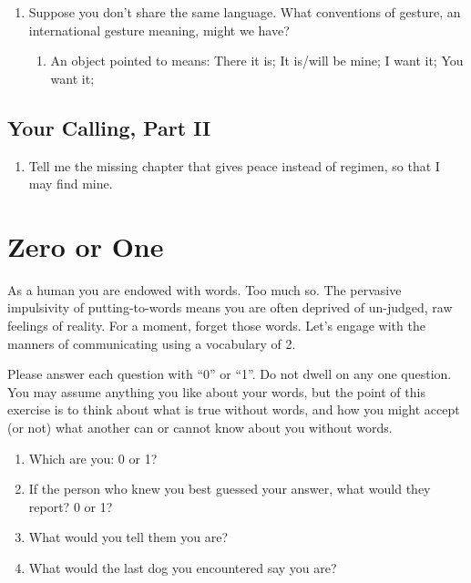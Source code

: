 \documentclass[
]{book}
\providecommand{\tightlist}{%
  \setlength{\itemsep}{0pt}\setlength{\parskip}{0pt}}
\begin{document}
\begin{enumerate}
\def\labelenumi{\arabic{enumi}.}
\setcounter{enumi}{64}
\tightlist
\item
  Suppose you don't share the same language. What conventions of
  gesture, an international gesture meaning, might we have?

  \begin{enumerate}
  \def\labelenumii{\arabic{enumii}.}
  \tightlist
  \item
    An object pointed to means: There it is; It is/will be mine; I
    want it; You want it;
  \end{enumerate}
\end{enumerate}

\hypertarget{your-calling-part-ii}{%
\section{Your Calling, Part II}\label{your-calling-part-ii}}

\begin{enumerate}
\def\labelenumi{\arabic{enumi}.}
\setcounter{enumi}{65}
\tightlist
\item
  Tell me the missing chapter that gives peace instead of regimen, so
  that I may find mine.
\end{enumerate}

\hypertarget{appendix-lessons}{%
\appendix}


\hypertarget{zero-or-one}{%
\chapter{Zero or One}\label{zero-or-one}}

As a human you are endowed with words.
Too much so. The pervasive impulsivity of putting-to-words means you are often deprived
of un-judged, raw feelings of reality.
For a moment, forget those words.
Let's engage with the manners of communicating
using a vocabulary of 2.

Please answer each question with ``0'' or ``1''.
Do not dwell on any one question.
You may assume anything you like about your words,
but the point of this exercise is to think about what is true without words, and how you might accept (or not)
what another can or cannot know about you without words.

\begin{enumerate}
\def\labelenumi{\arabic{enumi}.}
\tightlist
\item
  Which are you: 0 or 1?
\item
  If the person who knew you best guessed your answer,
  what would they report? 0 or 1?
\item
  What would you tell them you are?
\item
  What would the last dog you encountered say you are?
\end{enumerate}
\end{document}
